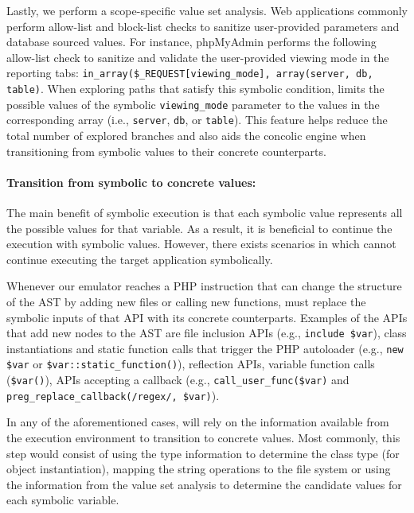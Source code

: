 Lastly, we perform a scope-specific value set analysis. 
Web applications commonly perform allow-list and block-list checks to sanitize user-provided parameters and database sourced values. 
For instance, phpMyAdmin performs the following allow-list check to sanitize and validate the user-provided viewing mode in the reporting tabs: \texttt{in\_array(\$\_REQUEST[\textquotesingle{}viewing\_mode\textquotesingle{}], array(\textquotesingle{}server\textquotesingle{}, \textquotesingle{}db\textquotesingle{}, \textquotesingle{}table\textquotesingle{})}. 
When exploring paths that satisfy this symbolic condition, \animatedead{} limits the possible values of the symbolic \texttt{\textquotesingle{}viewing\_mode\textquotesingle{}} parameter to the values in the corresponding array (i.e., \texttt{\textquotesingle{}server\textquotesingle{}}, \texttt{\textquotesingle{}db\textquotesingle{}}, or \texttt{\textquotesingle{}table\textquotesingle{}}). 
This feature helps reduce the total number of explored branches and also aids the concolic engine when transitioning from symbolic values to their concrete counterparts. 


\paragraph{Transition from symbolic to concrete values:} 
The main benefit of symbolic execution is that each symbolic value represents all the possible values for that variable. 
As a result, it is beneficial to continue the execution with symbolic values. 
However, there exists scenarios in which \animatedead{} cannot continue executing the target application symbolically. 

Whenever our emulator reaches a PHP instruction that can change the structure of the AST by adding new files or calling new functions, \animatedead{} must replace the symbolic inputs of that API with its concrete counterparts. 
Examples of the APIs that add new nodes to the AST are file inclusion APIs (e.g., \texttt{include \$var}), class instantiations and static function calls that trigger the PHP autoloader (e.g., \texttt{new \$var} or \texttt{\$var::static\_function()}), reflection APIs, variable function calls (\texttt{\$var()}), APIs accepting a callback (e.g., \texttt{call\_user\_func(\$var)} and \texttt{preg\_replace\_callback(/regex/, \$var)}). 

In any of the aforementioned cases, \animatedead{} will rely on the information available from the execution environment to transition to concrete values. 
Most commonly, this step would consist of using the type information to determine the class type (for object instantiation), mapping the string operations to the file system or using the information from the value set analysis to determine the candidate values for each symbolic variable. 

